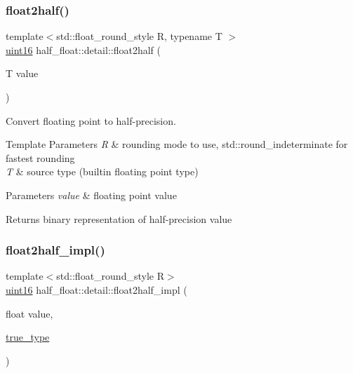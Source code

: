 \mbox{\label{namespacehalf__float_1_1detail_a323f122774a4f85d4ce4c4d91a8d066b}} 
\subsubsection{\texorpdfstring{float2half()}{float2half()}}
{\footnotesize\ttfamily template$<$std\+::float\+\_\+round\+\_\+style R, typename T $>$ \\
\hyperlink{namespacehalf__float_1_1detail_a239ec58092b4e4849b444baee1a01088}{uint16} half\+\_\+float\+::detail\+::float2half (\begin{DoxyParamCaption}\item[{T}]{value }\end{DoxyParamCaption})}

Convert floating point to half-\/precision. 
\begin{DoxyTemplParams}{Template Parameters}
{\em R} & rounding mode to use, {\ttfamily std\+::round\+\_\+indeterminate} for fastest rounding \\
\hline
{\em T} & source type (builtin floating point type) \\
\hline
\end{DoxyTemplParams}

\begin{DoxyParams}{Parameters}
{\em value} & floating point value \\
\hline
\end{DoxyParams}
\begin{DoxyReturn}{Returns}
binary representation of half-\/precision value 
\end{DoxyReturn}
\mbox{\label{namespacehalf__float_1_1detail_a32be02e128131df654adb21672ad1e8d}} 
\subsubsection{\texorpdfstring{float2half\+\_\+impl()}{float2half\_impl()}\hspace{0.1cm}{\footnotesize\ttfamily [1/3]}}
{\footnotesize\ttfamily template$<$std\+::float\+\_\+round\+\_\+style R$>$ \\
\hyperlink{namespacehalf__float_1_1detail_a239ec58092b4e4849b444baee1a01088}{uint16} half\+\_\+float\+::detail\+::float2half\+\_\+impl (\begin{DoxyParamCaption}\item[{float}]{value,  }\item[{\hyperlink{namespacehalf__float_1_1detail_a5e245748a3cc20e348dd92383d99d03c}{true\+\_\+type}}]{ }\end{DoxyParamCaption})}

